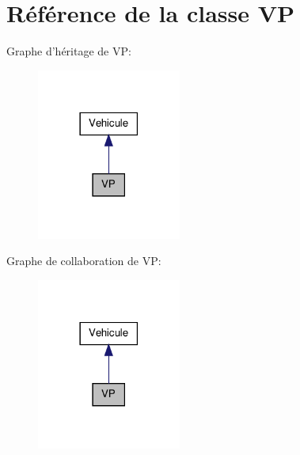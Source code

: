 \hypertarget{class_v_p}{
\section{Référence de la classe VP}
\label{class_v_p}
}


Graphe d'héritage de VP:
\nopagebreak
\begin{figure}[H]
\begin{center}
\leavevmode
\includegraphics[width=134pt]{class_v_p__inherit__graph}
\end{center}
\end{figure}


Graphe de collaboration de VP:
\nopagebreak
\begin{figure}[H]
\begin{center}
\leavevmode
\includegraphics[width=134pt]{class_v_p__coll__graph}
\end{center}
\end{figure}

